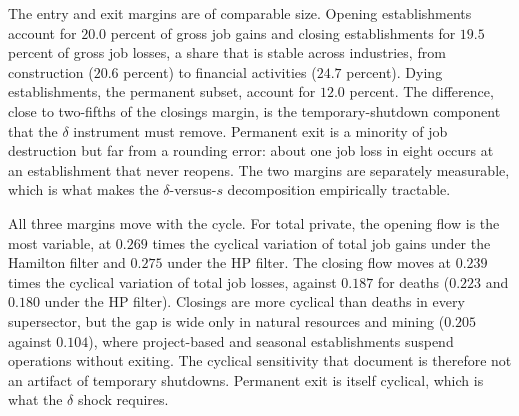 \documentclass[authoryear, review, 12pt]{elsarticle}
\begin{document}
	The entry and exit margins are of comparable size. Opening establishments account for
	$20.0$ percent of gross job gains and closing establishments for $19.5$ percent of gross
	job losses, a share that is stable across industries, from construction ($20.6$ percent) to
	financial activities ($24.7$ percent). Dying establishments, the permanent subset, account
	for $12.0$ percent. The difference, close to two-fifths of the closings margin, is the
	temporary-shutdown component that the $\delta$ instrument must remove. Permanent exit is a
	minority of job destruction but far from a rounding error: about one job loss in eight
	occurs at an establishment that never reopens. The two margins are separately measurable,
	which is what makes the $\delta$-versus-$s$ decomposition empirically tractable.

	All three margins move with the cycle. For total private, the opening flow is the most
	variable, at $0.269$ times the cyclical variation of total job gains under the Hamilton
	filter and $0.275$ under the HP filter. The closing flow moves at $0.239$ times the
	cyclical variation of total job losses, against $0.187$ for deaths ($0.223$ and $0.180$
	under the HP filter). Closings are more cyclical than deaths in every supersector, but the
	gap is wide only in natural resources and mining ($0.205$ against $0.104$), where
	project-based and seasonal establishments suspend operations without exiting. The
	cyclical sensitivity that \citet{jaimovich_2008} document is therefore not an artifact of
	temporary shutdowns. Permanent exit is itself cyclical, which is what the $\delta$ shock
	requires.
\end{document}

